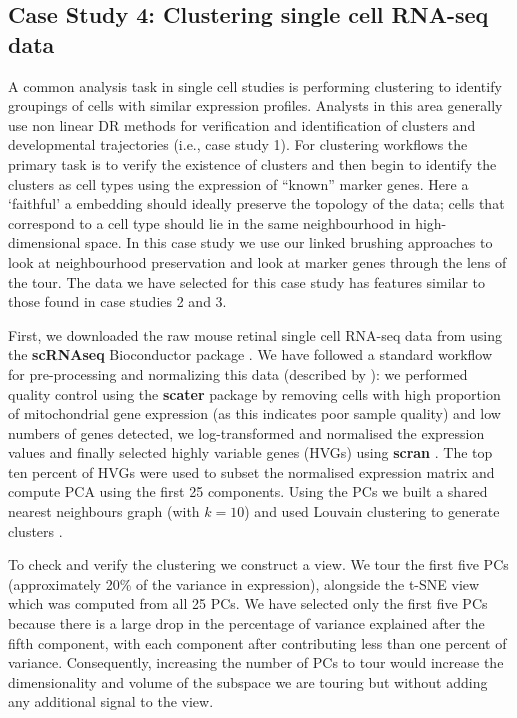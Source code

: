 \documentclass[article,notitle]{jdssv}
\begin{document}
\hypertarget{case-study-4-clustering-single-cell-rna-seq-data}{%
\subsection{Case Study 4: Clustering single cell RNA-seq data}\label{case-study-4-clustering-single-cell-rna-seq-data}}

A common analysis task in single cell studies is performing clustering to
identify groupings of cells with similar expression profiles. Analysts
in this area generally use non linear DR methods for verification and identification
of clusters and developmental trajectories (i.e., case study 1). For clustering
workflows the primary task is to verify the existence of clusters and then begin to
identify the clusters as cell types using the expression of ``known''
marker genes. Here a `faithful' a embedding should ideally preserve the topology
of the data; cells that correspond to a cell type should lie in the same
neighbourhood in high-dimensional space. In this case study we use our
linked brushing approaches to look at neighbourhood preservation
and look at marker genes through the lens of the tour. The data we have
selected for this case study has features similar to those found in case studies
2 and 3.

First, we downloaded the raw mouse retinal single cell RNA-seq data from
\citet{Macosko2015-ot} using the \textbf{scRNAseq} Bioconductor package \citep{scRNAseq-d}. We
have followed a standard workflow for pre-processing and normalizing this data
(described by \citet{Amezquita2020-at}): we performed quality control using the \textbf{scater} package
by removing cells with high proportion of mitochondrial gene expression (as this indicates poor sample quality) and low
numbers of genes detected, we log-transformed and normalised the expression
values and finally selected highly variable genes (HVGs) using \textbf{scran}
\citep{McCarthy2017, Lun2016}. The top ten percent of HVGs were used to subset
the normalised expression matrix and compute PCA using the first 25 components.
Using the PCs we built a shared nearest neighbours graph (with \(k = 10\)) and
used Louvain clustering to generate clusters \citep{Blondel2008-bx}.

To check and verify the clustering we construct a  view.
We tour the first five PCs (approximately 20\% of the variance in expression),
alongside the t-SNE view which was computed from all 25 PCs. We have selected only the first five PCs because there is a large drop in the percentage of variance explained after the fifth component, with each component after contributing less than one percent of variance.
Consequently, increasing the number of PCs to tour would increase the dimensionality and volume of the subspace we are touring but without adding any additional signal to the view.
\end{document}
